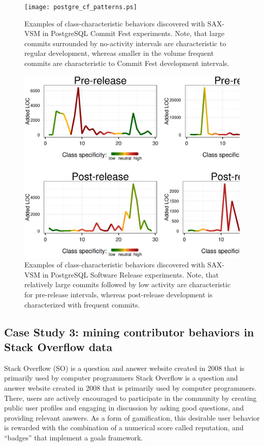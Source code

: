 \begin{figure}[h!]
   \centering
   \texttt{[image: postgre\_cf\_patterns.ps]}
   \caption{Examples of class-characteristic behaviors discovered with SAX-VSM in PostgreSQL Commit Fest experiments. Note, that large commits surrounded by no-activity intervals are characteristic to regular development, whereas smaller in the volume frequent commits are characteristic to Commit Fest development intervals. }
   \label{fig:postgre_cf_patterns}   
   \includegraphics[width=145mm]{figures/postgre_release_patterns.ps}
   \caption{Examples of class-characteristic behaviors discovered with SAX-VSM in PostgreSQL Software Release experiments. Note, that relatively large commits followed by low activity are characteristic for pre-release intervals, whereas post-release development is characterized with frequent commits.}
   \label{fig:postgre_release_patterns}
\end{figure}

\subsection{Case Study 3: mining contributor behaviors in Stack Overflow data}
Stack Overflow (SO) is a question and answer website created in 2008 that is primarily used by computer programmers Stack Overflow is a question and answer website created 
in 2008 that is primarily used by computer programmers. There, users are actively encouraged to participate in the community by creating public user profiles and engaging in discussion by asking good questions, and providing relevant answers. As a form of gamification, this desirable user behavior is rewarded with the combination of a numerical score called reputation, and ``badges'' that implement a goals framework. 


